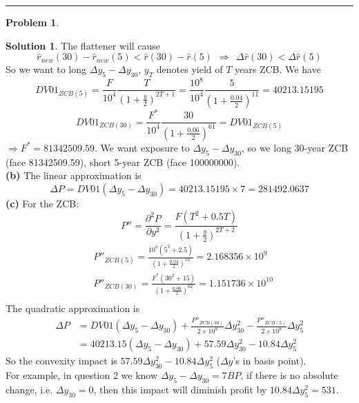 \documentclass[a4paper, 10pt]{article}
\theoremstyle{definition}
\newtheorem{problem}{Problem}
\theoremstyle{hSol}
\newtheorem*{solution}{Solution}
\begin{document}
\noindent\rule{16cm}{0.4pt}
\begin{problem}
\end{problem}
\begin{solution} The flattener will cause 
$$
\hat{r}_{new}(30) - \hat{r}_{new}(5) < \hat{r}(30) - \hat{r}(5)~~\Rightarrow~~\Delta\hat{r}(30) < \Delta\hat{r}(5)
$$
So we want to long $\Delta y_5 - \Delta y_{30}$, $y_T$ denotes yield of $T$ years ZCB. We have
$$
DV01_{ZCB(5)} = \frac{F}{10^4}\frac{T}{(1+\frac{y}{2})^{2T+1}} = \frac{10^8}{10^4}\frac{5}{(1+\frac{0.04}{2})^{11}} = 40213.15195
$$
$$
DV01_{ZCB(30)} = \frac{F^*}{10^4}\frac{30}{(1+\frac{0.06}{2})^{61}} = DV01_{ZCB(5)}
$$
$\Rightarrow F^* = 81342509.59$. We want exposure to $\Delta y_5 - \Delta y_{30}$, so we long 30-year ZCB (face 81342509.59), short 5-year ZCB (face 100000000).\\
\textbf{(b)} The linear approximation is
\begin{equation}
  \Delta P = DV01(\Delta y_5 - \Delta y_{30}) = 40213.15195 \times 7 = 281492.0637
\end{equation}
\textbf{(c)} For the ZCB:
$$
P'' = \frac{\partial^2 P}{\partial y^2} = \frac{F(T^2+0.5T)}{(1+\frac{y}{2})^{2T+2}}
$$
\begin{equation}
  \begin{split}
    &P''_{ZCB(5)} = \frac{10^8(5^2+2.5)}{(1+\frac{0.04}{2})^{12}} = 2.168356\times10^9\\
    &P''_{ZCB(30)} = \frac{F^*(30^2+15)}{(1+\frac{0.06}{2})^{62}} = 1.151736\times10^{10}\\
  \end{split}
\end{equation}
The quadratic approximation is
\begin{equation}
  \begin{split}
    \Delta P &= DV01(\Delta y_5 - \Delta y_{30}) + \frac{P''_{ZCB(30)}}{2\times10^8}\Delta y_{30}^2 - \frac{P''_{ZCB(5)}}{2\times10^8}\Delta y_{5}^2 \\
    &=40213.15(\Delta y_5 - \Delta y_{30}) + 57.59\Delta y_{30}^2 - 10.84\Delta y_5^2
  \end{split}
\end{equation}
So the convexity impact is $57.59\Delta y_{30}^2 - 10.84\Delta y_5^2$ ($\Delta y$'s in basis point). \\
For example, in question 2 we know $\Delta y_5-\Delta y_{30}=7BP$, if there is no absolute change, i.e. $\Delta y_{30}=0$, then this impact will diminish profit by $10.84\Delta y_5^2=531$.
\end{solution}
\end{document}
